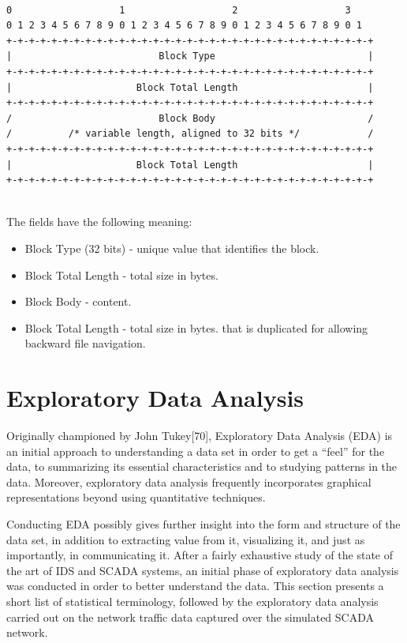 \documentclass[12pt,]{article}
\begin{document}
\begin{verbatim}

0                   1                   2                   3
0 1 2 3 4 5 6 7 8 9 0 1 2 3 4 5 6 7 8 9 0 1 2 3 4 5 6 7 8 9 0 1
+-+-+-+-+-+-+-+-+-+-+-+-+-+-+-+-+-+-+-+-+-+-+-+-+-+-+-+-+-+-+-+-+
|                          Block Type                           |
+-+-+-+-+-+-+-+-+-+-+-+-+-+-+-+-+-+-+-+-+-+-+-+-+-+-+-+-+-+-+-+-+
|                      Block Total Length                       |
+-+-+-+-+-+-+-+-+-+-+-+-+-+-+-+-+-+-+-+-+-+-+-+-+-+-+-+-+-+-+-+-+
/                          Block Body                           /
/          /* variable length, aligned to 32 bits */            /
+-+-+-+-+-+-+-+-+-+-+-+-+-+-+-+-+-+-+-+-+-+-+-+-+-+-+-+-+-+-+-+-+
|                      Block Total Length                       |
+-+-+-+-+-+-+-+-+-+-+-+-+-+-+-+-+-+-+-+-+-+-+-+-+-+-+-+-+-+-+-+-+    
    
\end{verbatim}

The fields have the following meaning:

\begin{itemize}
\itemsep1pt\parskip0pt
\item
  Block Type (32 bits) - unique value that identifies the block.
\item
  Block Total Length - total size in bytes.
\item
  Block Body - content.
\item
  Block Total Length - total size in bytes. that is duplicated for
  allowing backward file navigation.
\end{itemize}

\pagebreak

\section{Exploratory Data Analysis}\label{exploratory-data-analysis}

Originally championed by John Tukey{[}70{]}, Exploratory Data Analysis
(EDA) is an initial approach to understanding a data set in order to get
a ``feel'' for the data, to summarizing its essential characteristics
and to studying patterns in the data. Moreover, exploratory data
analysis frequently incorporates graphical representations beyond using
quantitative techniques.

Conducting EDA possibly gives further insight into the form and
structure of the data set, in addition to extracting value from it,
visualizing it, and just as importantly, in communicating it. After a
fairly exhaustive study of the state of the art of IDS and SCADA
systems, an initial phase of exploratory data analysis was conducted in
order to better understand the data. This section presents a short list
of statistical terminology, followed by the exploratory data analysis
carried out on the network traffic data captured over the simulated
SCADA network.
\end{document}
